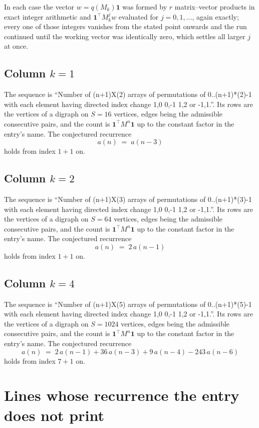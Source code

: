 \documentclass[11pt,a4paper]{article}
\theoremstyle{plain}
\theoremstyle{definition}
\begin{document}
In each case the vector $w=q(M_k)\mathbf{1}$ was formed by $r$ matrix--vector products in
exact integer arithmetic and $\mathbf{1}^{\!\top}M_k^{j}w$ evaluated for $j=0,1,\dots$,
again exactly; every one of those integers vanishes from the stated point onwards and the run
continued until the working vector was identically zero, which settles all larger $j$ at once.

\subsection*{Column $k$$=1$}
The sequence is ``Number of (n+1)X(2) arrays of permutations of 0..(n+1)*(2)-1 with each element having directed index change 1,0 0,-1 1,2 or -1,1.''. Its rows are the vertices of a digraph on
$S=16$ vertices, edges being the admissible consecutive pairs, and the count is
$\mathbf{1}^{\!\top}M^{n}\mathbf{1}$ up to the constant factor in the entry's name.
The conjectured recurrence
\[
a(n)\;=\;a(n-3)
\]
holds from index $1+1$ on.

\subsection*{Column $k$$=2$}
The sequence is ``Number of (n+1)X(3) arrays of permutations of 0..(n+1)*(3)-1 with each element having directed index change 1,0 0,-1 1,2 or -1,1.''. Its rows are the vertices of a digraph on
$S=64$ vertices, edges being the admissible consecutive pairs, and the count is
$\mathbf{1}^{\!\top}M^{n}\mathbf{1}$ up to the constant factor in the entry's name.
The conjectured recurrence
\[
a(n)\;=\;2\,a(n-1)
\]
holds from index $1+1$ on.

\subsection*{Column $k$$=4$}
The sequence is ``Number of (n+1)X(5) arrays of permutations of 0..(n+1)*(5)-1 with each element having directed index change 1,0 0,-1 1,2 or -1,1.''. Its rows are the vertices of a digraph on
$S=1024$ vertices, edges being the admissible consecutive pairs, and the count is
$\mathbf{1}^{\!\top}M^{n}\mathbf{1}$ up to the constant factor in the entry's name.
The conjectured recurrence
\[
a(n)\;=\;2\,a(n-1) + 36\,a(n-3) + 9\,a(n-4) - 243\,a(n-6)
\]
holds from index $7+1$ on.


\section{Lines whose recurrence the entry does not print}
\end{document}
